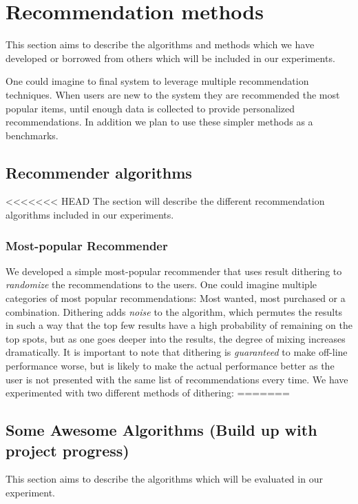 
\section{Recommendation methods}

This section aims to describe the algorithms and methods which we have developed or borrowed from others which will be included in our experiments.

One could imagine to final system to leverage multiple recommendation techniques. When users are new to the system they
are recommended the most popular items, until enough data is collected to provide personalized recommendations. In addition we plan to use these simpler methods as a benchmarks.

\subsection{Recommender algorithms}

<<<<<<< HEAD
The section will describe the different recommendation algorithms included in our experiments.

\subsubsection{Most-popular Recommender}

We developed a simple most-popular recommender that uses result dithering to \emph{randomize} the recommendations to the users. One could imagine multiple categories of most popular recommendations: Most wanted, most purchased or a combination. Dithering adds \emph{noise} to the algorithm, which permutes the results in such a way that the top few results have a high probability of remaining on the top spots, but as one goes deeper into the results, the degree of mixing increases dramatically. It is important to note that dithering is \emph{guaranteed} to make off-line performance worse, but is likely to make the actual performance better as the user is not presented with the same list of recommendations every time. We have experimented with two different methods of dithering:
=======
\subsection{Some Awesome Algorithms (Build up with project progress)}
This section aims to describe the algorithms which will be evaluated in our experiment.

